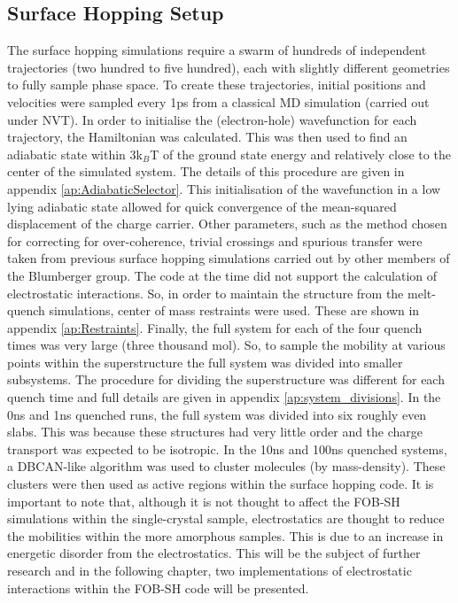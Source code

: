 \subsection{Surface Hopping Setup}
The surface hopping simulations require a swarm of hundreds of independent trajectories (two hundred to five hundred), each with slightly different geometries to fully sample phase space. To create these trajectories, initial positions and velocities were sampled every 1ps from a classical MD simulation (carried out under NVT). In order to initialise the (electron-hole) wavefunction for each trajectory, the Hamiltonian was calculated. This was then used to find an adiabatic state within 3k$_{B}$T of the ground state energy and relatively close to the center of the simulated system. The details of this procedure are given in appendix \ref{ap:AdiabaticSelector}. This initialisation of the wavefunction in a low lying adiabatic state allowed for quick convergence of the mean-squared displacement of the charge carrier. Other parameters, such as the method chosen for correcting for over-coherence, trivial crossings and spurious transfer were taken from previous surface hopping simulations carried out by other members of the Blumberger group. The code at the time did not support the calculation of electrostatic interactions. So, in order to maintain the structure from the melt-quench simulations, center of mass restraints were used. These are shown in appendix \ref{ap:Restraints}. Finally, the full system for each of the four quench times was very large (three thousand mol). So, to sample the mobility at various points within the superstructure the full system was divided into smaller subsystems. The procedure for dividing the superstructure was different for each quench time and full details are given in appendix \ref{ap:system_divisions}. In the 0ns and 1ns quenched runs, the full system was divided into six roughly even slabs. This was because these structures had very little order and the charge transport was expected to be isotropic. In the 10ns and 100ns quenched systems, a DBCAN-like algorithm \cite{DBSCAN} was used to cluster molecules (by mass-density). These clusters were then used as active regions within the surface hopping code. It is important to note that, although it is not thought to affect the FOB-SH simulations within the single-crystal sample, electrostatics are thought to reduce the mobilities within the more amorphous samples. This is due to an increase in energetic disorder \cite{ESEffectOnMob} from the electrostatics. This will be the subject of further research and in the following chapter, two implementations of electrostatic interactions within the FOB-SH code will be presented.

